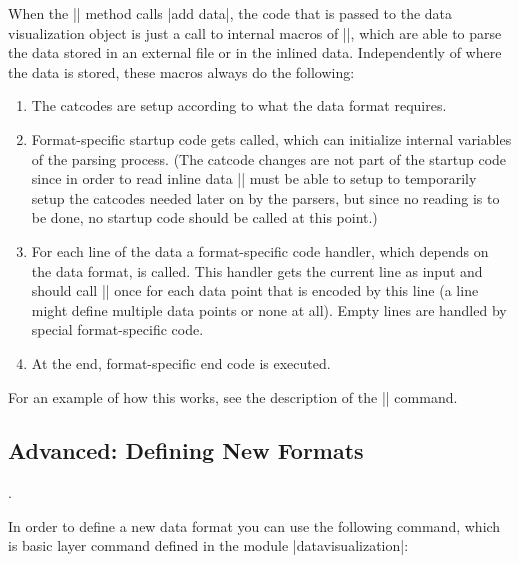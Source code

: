 \begin{command}{\pgfdata{}}
  When the |\pgfdata| method calls |add data|, the code that is passed
  to the data visualization object is just a call to internal macros
  of |\pgfdata|, which are able to parse the data stored in an
  external file or in the inlined data. Independently of where the
  data is stored, these macros always do the following:
  \begin{enumerate}
  \item The catcodes are setup according to what the data
    format requires.
  \item Format-specific startup code gets called, which can initialize
    internal 
    variables of the parsing process. (The catcode changes are not
    part of the startup code since in order to read inline data
    |\pgfdata| must be able to setup to temporarily setup the catcodes
    needed later on by the parsers, but since no reading is to be
    done, no startup code should be called at this point.)
  \item For each line of the data a format-specific code handler,
    which depends on the 
    data format, is called. This handler gets the current line as
    input and should call |\pgfdatapoint| once for each data point
    that is encoded by this line (a line might define multiple data
    points or none at all). Empty lines are handled by special
    format-specific code.
  \item At the end, format-specific end code is executed.    
  \end{enumerate}
  For an example of how this works, see the description of the
  |\pgfdeclaredataformat| command.
\end{command}


\subsection{Advanced: Defining New Formats}
\label{section-dv-declaring-formats}.

In order to define a new data format you can use the following
command, which is basic layer command defined in the module
|datavisualization|:

